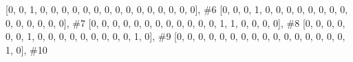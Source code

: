 \documentclass[
  letterpaper,
  DIV=11,
  numbers=noendperiod]{scrreprt}
\newenvironment{Shaded}{\begin{snugshade}}{\end{snugshade}}
\newcommand{\CommentTok}[1]{\textcolor[rgb]{0.37,0.37,0.37}{#1}}
\newcommand{\DecValTok}[1]{\textcolor[rgb]{0.68,0.00,0.00}{#1}}
\newcommand{\NormalTok}[1]{\textcolor[rgb]{0.00,0.23,0.31}{#1}}
\begin{document}
\begin{tcolorbox}
\begin{Shaded}
\begin{Highlighting}[]
\NormalTok{                    [}\DecValTok{0}\NormalTok{, }\DecValTok{0}\NormalTok{, }\DecValTok{1}\NormalTok{, }\DecValTok{0}\NormalTok{, }\DecValTok{0}\NormalTok{, }\DecValTok{0}\NormalTok{, }\DecValTok{0}\NormalTok{, }\DecValTok{0}\NormalTok{, }\DecValTok{0}\NormalTok{, }\DecValTok{0}\NormalTok{, }\DecValTok{0}\NormalTok{, }\DecValTok{0}\NormalTok{, }\DecValTok{0}\NormalTok{, }\DecValTok{0}\NormalTok{, }\DecValTok{0}\NormalTok{, }\DecValTok{0}\NormalTok{, }\DecValTok{0}\NormalTok{, }\DecValTok{0}\NormalTok{], }\CommentTok{\#6}
\NormalTok{                    [}\DecValTok{0}\NormalTok{, }\DecValTok{0}\NormalTok{, }\DecValTok{0}\NormalTok{, }\DecValTok{1}\NormalTok{, }\DecValTok{0}\NormalTok{, }\DecValTok{0}\NormalTok{, }\DecValTok{0}\NormalTok{, }\DecValTok{0}\NormalTok{, }\DecValTok{0}\NormalTok{, }\DecValTok{0}\NormalTok{, }\DecValTok{0}\NormalTok{, }\DecValTok{0}\NormalTok{, }\DecValTok{0}\NormalTok{, }\DecValTok{0}\NormalTok{, }\DecValTok{0}\NormalTok{, }\DecValTok{0}\NormalTok{, }\DecValTok{0}\NormalTok{, }\DecValTok{0}\NormalTok{], }\CommentTok{\#7}
\NormalTok{                    [}\DecValTok{0}\NormalTok{, }\DecValTok{0}\NormalTok{, }\DecValTok{0}\NormalTok{, }\DecValTok{0}\NormalTok{, }\DecValTok{0}\NormalTok{, }\DecValTok{0}\NormalTok{, }\DecValTok{0}\NormalTok{, }\DecValTok{0}\NormalTok{, }\DecValTok{0}\NormalTok{, }\DecValTok{0}\NormalTok{, }\DecValTok{0}\NormalTok{, }\DecValTok{0}\NormalTok{, }\DecValTok{1}\NormalTok{, }\DecValTok{1}\NormalTok{, }\DecValTok{0}\NormalTok{, }\DecValTok{0}\NormalTok{, }\DecValTok{0}\NormalTok{, }\DecValTok{0}\NormalTok{], }\CommentTok{\#8}
\NormalTok{                    [}\DecValTok{0}\NormalTok{, }\DecValTok{0}\NormalTok{, }\DecValTok{0}\NormalTok{, }\DecValTok{0}\NormalTok{, }\DecValTok{0}\NormalTok{, }\DecValTok{0}\NormalTok{, }\DecValTok{1}\NormalTok{, }\DecValTok{0}\NormalTok{, }\DecValTok{0}\NormalTok{, }\DecValTok{0}\NormalTok{, }\DecValTok{0}\NormalTok{, }\DecValTok{0}\NormalTok{, }\DecValTok{0}\NormalTok{, }\DecValTok{0}\NormalTok{, }\DecValTok{0}\NormalTok{, }\DecValTok{0}\NormalTok{, }\DecValTok{1}\NormalTok{, }\DecValTok{0}\NormalTok{], }\CommentTok{\#9}
\NormalTok{                    [}\DecValTok{0}\NormalTok{, }\DecValTok{0}\NormalTok{, }\DecValTok{0}\NormalTok{, }\DecValTok{0}\NormalTok{, }\DecValTok{0}\NormalTok{, }\DecValTok{0}\NormalTok{, }\DecValTok{0}\NormalTok{, }\DecValTok{0}\NormalTok{, }\DecValTok{0}\NormalTok{, }\DecValTok{0}\NormalTok{, }\DecValTok{0}\NormalTok{, }\DecValTok{0}\NormalTok{, }\DecValTok{0}\NormalTok{, }\DecValTok{0}\NormalTok{, }\DecValTok{0}\NormalTok{, }\DecValTok{0}\NormalTok{, }\DecValTok{1}\NormalTok{, }\DecValTok{0}\NormalTok{], }\CommentTok{\#10}

\end{Highlighting}
\end{Shaded}
\end{tcolorbox}
\end{document}
